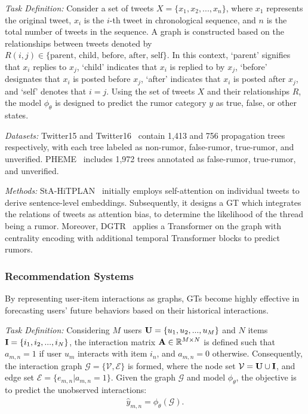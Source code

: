 \textit{Task Definition:}
Consider a set of tweets $X = \{x_1, x_2, ..., x_n\}$, where $x_1$ represents the original tweet, $x_i$ is the $i$-th tweet in chronological sequence, and $n$ is the total number of tweets in the sequence. A graph is constructed based on the relationships between tweets denoted by $R(i, j) \in \{\text{parent, child, before, after, self}\}$. In this context, `parent' signifies that $x_i$ replies to $x_j$, `child' indicates that $x_i$ is replied to by $x_j$, `before' designates that $x_i$ is posted before $x_j$, `after' indicates that $x_i$ is posted after $x_j$, and `self' denotes that $i=j$. Using the set of tweets $X$ and their relationships $R$, the model $\phi_\theta$ is designed to predict the rumor category $y$ as true, false, or other states.

\textit{Datasets:}
Twitter15 and Twitter16~\cite{ma2018detect} contain 1,413 and 756 propagation trees  respectively, with each tree labeled as non-rumor, false-rumor, true-rumor, and unverified.
PHEME~\cite{kochkina_liakata_zubiaga_2018} includes 1,972 trees annotated as false-rumor, true-rumor, and unverified.

\textit{Methods:}
StA-HiTPLAN~\cite{khoo2020interpretable} initially employs self-attention on individual tweets to derive sentence-level embeddings. Subsequently, it designs a GT which integrates the relations of tweets as attention bias, to determine the likelihood of the thread being a rumor.
Moreover, DGTR~\cite{wei2023dgtr} applies a Transformer on the graph with centrality encoding with additional temporal Transformer blocks to predict rumors.

\subsubsection{\textbf{Recommendation Systems}}
By representing user-item interactions as graphs, GTs become highly effective in forecasting users' future behaviors based on their historical interactions.

\textit{Task Definition:} Considering $M$ users $\mathbf{U} = \{u_1, u_2, ..., u_M\}$ and $N$ items $\mathbf{I} = \{i_1, i_2, ..., i_N\}$, the interaction matrix $\mathbf{A} \in \mathbb{R}^{M \times N}$ is defined such that $a_{m,n} = 1$ if user $u_m$ interacts with item $i_n$, and $a_{m,n} = 0$ otherwise. Consequently, the interaction graph $\mathcal G = \{\mathcal V, \mathcal E\}$ is formed, where the node set $\mathcal V = \mathbf{U} \cup \mathbf{I}$, and edge set $\mathcal E = \{e_{m,n}|a_{m,n}=1\}$. Given the graph $\mathcal G$ and model $\phi_\theta$, the objective is to predict the unobserved interactions: 
\begin{align}
    \hat{y}_{m,n} = \phi_\theta(\mathcal G).
\end{align}

